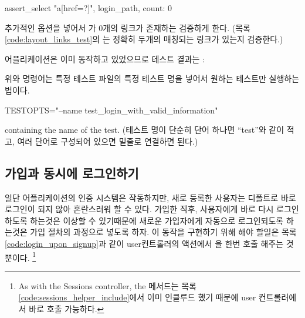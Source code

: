 \begin{code} assert_select "a[href=?]", login_path, count: 0 \end{code} 

\noindent 추가적인  옵션을 넣어서  가 0개의 링크가 존재하는 검증하게 한다. (목록 \ref{code:layout_links_test}의 는 정확히 두개의 매칭되는 링크가 있는지 검증한다.) 

어플리케이션은 이미 동작하고 있었으므로 테스트 결과는 \linebreak {}: 

\begin{codelisting}  

 \end{codelisting} 

\noindent 위와 명령어는 특정 테스트 파일의 특정 테스트 명을 넣어서 원하는 테스트만 실행하는 법이다. 

\begin{code} TESTOPTS="--name test_login_with_valid_information" \end{code} 

\noindent containing the name of the test. (테스트 명이 단순히 단어 하나면 ``test''와 같이 적고, 여러 단어로 구성되어 있으면 밑줄로 연결하면 된다.) 

\subsection{가입과 동시에 로그인하기} \label{sec:login_upon_signup} 

일단 어플리케이션의 인증 시스템은 작동하지만, 새로 등록한 사용자는 디폴트로 바로 로그인이 되지 않아 혼란스러워 할 수 있다. 가입한 직후, 사용자에게 바로 다시 로그인하도록 하는것은 이상할 수 있기때문에 새로운 가입자에게 자동으로 로그인되도록 하는것은 가입 절차의 과정으로 넣도록 하자. 이 동작을 구현하기 위해 해야 할일은 목록 \ref{code:login_upon_signup}과 같이 user컨트롤러의  액션에서 을 한번 호출 해주는 것 뿐이다. \footnote{As with the Sessions controller, the  메서드는 목록 \ref{code:sessions_helper_include}에서 이미 인클루드 했기 때문에 user 컨트롤러에서 바로 호출 가능하다.} 

